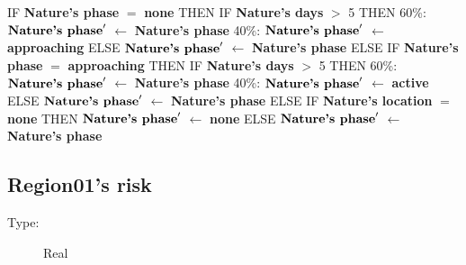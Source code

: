\documentclass{article}%
\begin{document}
\begin{flushleft}%
IF %
\textbf{Nature's phase}%
$=$%
\textbf{none}%
\linebreak%
\hspace*{2em}%
THEN %
IF %
\textbf{Nature's days}%
$>$%
5%
\linebreak%
\hspace*{4em}%
THEN %
\linebreak%
\hspace*{6em}%
60\%: %
$\mbox{\textbf{Nature's phase}} '$%
$\leftarrow$%
\textbf{Nature's phase}%
\linebreak%
\hspace*{6em}%
40\%: %
$\mbox{\textbf{Nature's phase}} '$%
$\leftarrow$%
\textbf{approaching}%
\linebreak%
\hspace*{4em}%
ELSE %
$\mbox{\textbf{Nature's phase}} '$%
$\leftarrow$%
\textbf{Nature's phase}%
\linebreak%
\hspace*{2em}%
ELSE %
IF %
\textbf{Nature's phase}%
$=$%
\textbf{approaching}%
\linebreak%
\hspace*{4em}%
THEN %
IF %
\textbf{Nature's days}%
$>$%
5%
\linebreak%
\hspace*{6em}%
THEN %
\linebreak%
\hspace*{8em}%
60\%: %
$\mbox{\textbf{Nature's phase}} '$%
$\leftarrow$%
\textbf{Nature's phase}%
\linebreak%
\hspace*{8em}%
40\%: %
$\mbox{\textbf{Nature's phase}} '$%
$\leftarrow$%
\textbf{active}%
\linebreak%
\hspace*{6em}%
ELSE %
$\mbox{\textbf{Nature's phase}} '$%
$\leftarrow$%
\textbf{Nature's phase}%
\linebreak%
\hspace*{4em}%
ELSE %
IF %
\textbf{Nature's location}%
$=$%
\textbf{none}%
\linebreak%
\hspace*{6em}%
THEN %
$\mbox{\textbf{Nature's phase}} '$%
$\leftarrow$%
\textbf{none}%
\linebreak%
\hspace*{6em}%
ELSE %
$\mbox{\textbf{Nature's phase}} '$%
$\leftarrow$%
\textbf{Nature's phase}%
\end{flushleft}

%
\subsection{Region01's risk}%
\label{subsec:Region01's risk}%
\begin{description}%
\item[Type:]%
Real%
\end{description}%
\end{document}
